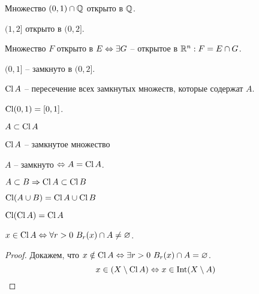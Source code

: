     \begin{Example}
        Множество $(0, 1) \cap \mathbb{Q}$ открыто в $\mathbb{Q}$.
    \end{Example}

    \begin{Example}
        $(1, 2]$ открыто в $(0, 2]$.  
    \end{Example}

    \begin{Rem}
        Множество $F$ открыто в $E \Leftrightarrow \exists G$ -- открытое в $\mathbb{R}^n : F = E \cap G$. 
    \end{Rem}

    \begin{Example}
        $(0, 1]$ -- замкнуто в $(0, 2]$.
    \end{Example}

    \begin{notation}
        $\operatorname{Cl} A$ -- пересечение всех замкнутых множеств, которые содержат $A$. 
    \end{notation}

    \begin{Example}
        $\operatorname{Cl} (0, 1) = [0, 1]$. 
    \end{Example}

    \begin{Thm}[Свойства]
        \begin{MyList}
            \item $A \subset \operatorname{Cl} A$
            \item $\operatorname{Cl} A$ -- замкнутое множество
            \item $A$ -- замкнуто $\Leftrightarrow A = \operatorname{Cl} A$.
            \item $A \subset B \Rightarrow \operatorname{Cl} A \subset \operatorname{Cl} B$
            \item $\operatorname{Cl} (A \cup B) = \operatorname{Cl} A \cup \operatorname{Cl} B$
            \item $\operatorname{Cl} (\operatorname{Cl} A) = \operatorname{Cl} A$      
        \end{MyList}
    \end{Thm}

    \begin{Thm}
        $x \in \operatorname{Cl} A \Leftrightarrow \forall r > 0 \ B_r(x) \cap A \neq \varnothing$. 
    \end{Thm}

    \begin{proof}
        Докажем, что $x \notin \operatorname{Cl} A \Leftrightarrow \exists r > 0 \ B_r(x) \cap A = \varnothing$.
        \[x \in \left(X \setminus \operatorname{Cl} A\right) \Leftrightarrow x \in \operatorname{Int} (X \setminus A)\]
    \end{proof}

